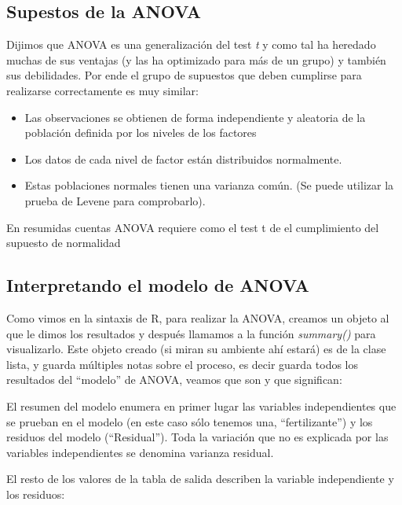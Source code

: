 \documentclass[
]{book}
\begin{document}
\hypertarget{supestos-de-la-anova}{%
\subsection{Supestos de la ANOVA}\label{supestos-de-la-anova}}

Dijimos que ANOVA es una generalización del test \emph{t} y como tal ha heredado muchas de sus ventajas (y las ha optimizado para más de un grupo) y también sus debilidades. Por ende el grupo de supuestos que deben cumplirse para realizarse correctamente es muy similar:

\begin{itemize}
\item
  Las observaciones se obtienen de forma independiente y aleatoria de la población definida por los niveles de los factores
\item
  Los datos de cada nivel de factor están distribuidos normalmente.
\item
  Estas poblaciones normales tienen una varianza común. (Se puede utilizar la prueba de Levene para comprobarlo).
\end{itemize}

En resumidas cuentas ANOVA requiere como el test t de el cumplimiento del supuesto de normalidad

\hypertarget{interpretando-el-modelo-de-anova}{%
\subsection{Interpretando el modelo de ANOVA}\label{interpretando-el-modelo-de-anova}}

Como vimos en la sintaxis de R, para realizar la ANOVA, creamos un objeto al que le dimos los resultados y después llamamos a la función \emph{summary()} para visualizarlo. Este objeto creado (si miran su ambiente ahí estará) es de la clase lista, y guarda múltiples notas sobre el proceso, es decir guarda todos los resultados del ``modelo'' de ANOVA, veamos que son y que significan:

El resumen del modelo enumera en primer lugar las variables independientes que se prueban en el modelo (en este caso sólo tenemos una, ``fertilizante'') y los residuos del modelo (``Residual''). Toda la variación que no es explicada por las variables independientes se denomina varianza residual.

El resto de los valores de la tabla de salida describen la variable independiente y los residuos:
\end{document}
